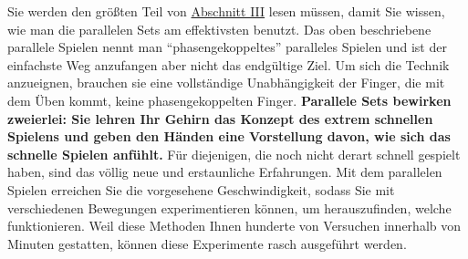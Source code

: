 Sie werden den größten Teil von \hyperref[c1iii1]{Abschnitt III} lesen müssen, damit Sie wissen, wie man die parallelen Sets am effektivsten benutzt.
Das oben beschriebene parallele Spielen nennt man \enquote{phasengekoppeltes} paralleles Spielen und ist der einfachste Weg anzufangen aber nicht das endgültige Ziel.
Um sich die Technik anzueignen, brauchen sie eine vollständige Unabhängigkeit der Finger, die mit dem Üben kommt, keine phasengekoppelten Finger.
\textbf{Parallele Sets bewirken zweierlei: Sie lehren Ihr Gehirn das Konzept des extrem schnellen Spielens und geben den Händen eine Vorstellung davon, wie sich das schnelle Spielen anfühlt.}
Für diejenigen, die noch nicht derart schnell gespielt haben, sind das völlig neue und erstaunliche Erfahrungen.
Mit dem parallelen Spielen erreichen Sie die vorgesehene Geschwindigkeit, sodass Sie mit verschiedenen Bewegungen experimentieren können, um herauszufinden, welche funktionieren.
Weil diese Methoden Ihnen hunderte von Versuchen innerhalb von Minuten gestatten, können diese Experimente rasch ausgeführt werden.
 


